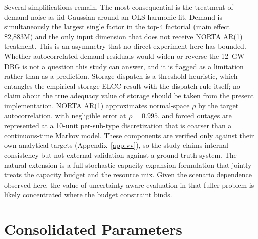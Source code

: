 \documentclass[11pt]{article}
\begin{document}
Several simplifications remain. The most consequential is the treatment of demand noise as iid Gaussian around an OLS harmonic fit. Demand is simultaneously the largest single factor in the top-4 factorial (main effect \$2{,}883M) and the only input dimension that does not receive NORTA AR(1) treatment. This is an asymmetry that no direct experiment here has bounded. Whether autocorrelated demand residuals would widen or reverse the 12~GW DBG is not a question this study can answer, and it is flagged as a limitation rather than as a prediction. Storage dispatch is a threshold heuristic, which entangles the empirical storage ELCC result with the dispatch rule itself; no claim about the true adequacy value of storage should be taken from the present implementation. NORTA AR(1) approximates normal-space $\rho$ by the target autocorrelation, with negligible error at $\rho = 0.995$, and forced outages are represented at a 10-unit per-sub-type discretization that is coarser than a continuous-time Markov model. These components are verified only against their own analytical targets (Appendix~\ref{app:vv}), so the study claims internal consistency but not external validation against a ground-truth system. The natural extension is a full stochastic capacity-expansion formulation that jointly treats the capacity budget and the resource mix. Given the scenario dependence observed here, the value of uncertainty-aware evaluation in that fuller problem is likely concentrated where the budget constraint binds.

\begingroup
\scriptsize
\setlength{\bibsep}{1.5pt plus 0.2ex}


\endgroup


\appendix

\section{Consolidated Parameters}\label{app:params}
\end{document}
